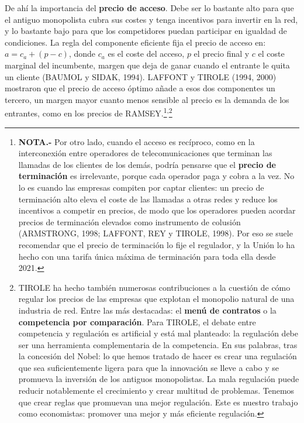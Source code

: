 \documentclass[10pt,a4paper]{article}
\begin{document}
De ahí la importancia del \textbf{precio de acceso}. Debe ser lo bastante alto para que el antiguo monopolista cubra sus costes y tenga incentivos para invertir en la red, y lo bastante bajo para que los competidores puedan participar en igualdad de condiciones. La regla del componente eficiente fija el precio de acceso en: $a=c_a+(p-c)$, donde $c_a$ es el coste del acceso, $p$ el precio final y $c$ el coste marginal del incumbente, margen que deja de ganar cuando el entrante le quita un cliente (BAUMOL y SIDAK, 1994). LAFFONT y TIROLE (1994, 2000) mostraron que el precio de acceso óptimo añade a esos dos componentes un tercero, un margen mayor cuanto menos sensible al precio es la demanda de los entrantes, como en los precios de RAMSEY.\footnote{%
  \textbf{NOTA.-} Por otro lado, cuando el acceso es recíproco, como en la interconexión entre operadores de telecomunicaciones que terminan las llamadas de los clientes de los demás, podría pensarse que el \textbf{precio de terminación} es irrelevante, porque cada operador paga y cobra a la vez. No lo es cuando las empresas compiten por captar clientes: un precio de terminación alto eleva el coste de las llamadas a otras redes y reduce los incentivos a competir en precios, de modo que los operadores pueden acordar precios de terminación elevados como instrumento de colusión (ARMSTRONG, 1998; LAFFONT, REY y TIROLE, 1998). Por eso se suele recomendar que el precio de terminación lo fije el regulador, y la Unión lo ha hecho con una tarifa única máxima de terminación para toda ella desde 2021.
}\textsuperscript{,}\footnote{%
  TIROLE ha hecho también numerosas contribuciones a la cuestión de cómo regular los precios de las empresas que explotan el monopolio natural de una industria de red. Entre las más destacadas: el \textbf{menú de contratos} o la \textbf{competencia por comparación}. Para TIROLE, el debate entre competencia y regulación es artificial y está mal planteado: la regulación debe ser una herramienta complementaria de la competencia. En sus palabras, tras la concesión del Nobel: lo que hemos tratado de hacer es crear una regulación que sea suficientemente ligera para que la innovación se lleve a cabo y se promueva la inversión de los antiguos monopolistas. La mala regulación puede reducir notablemente el crecimiento y crear multitud de problemas. Tenemos que crear reglas que promuevan una mejor regulación. Este es nuestro trabajo como economistas: promover una mejor y más eficiente regulación.
}
\end{document}
